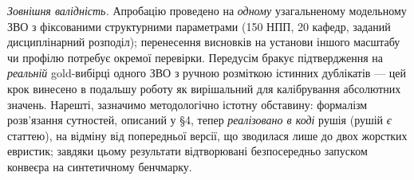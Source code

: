 \textit{Зовнішня валідність.} Апробацію проведено на \textit{одному} узагальненому модельному ЗВО з фіксованими структурними параметрами (150 НПП, 20 кафедр, заданий дисциплінарний розподіл); перенесення висновків на установи іншого масштабу чи профілю потребує окремої перевірки. Передусім бракує підтвердження на \textit{реальній} gold-вибірці одного ЗВО з ручною розміткою істинних дублікатів --- цей крок винесено в подальшу роботу як вирішальний для калібрування абсолютних значень. Нарешті, зазначимо методологічно істотну обставину: формалізм розв'язання сутностей, описаний у §4, тепер \textit{реалізовано в коді} рушія (рушій \textit{є} статтею), на відміну від попередньої версії, що зводилася лише до двох жорстких евристик; завдяки цьому результати відтворювані безпосередньо запуском конвеєра на синтетичному бенчмарку.